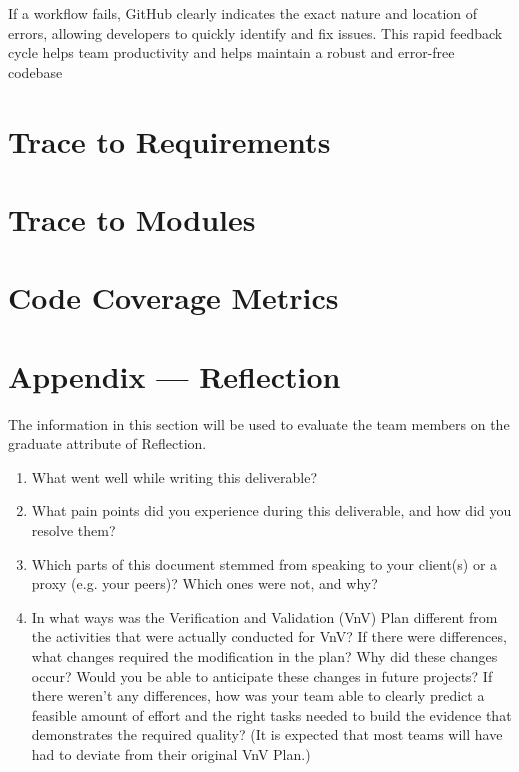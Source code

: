 \documentclass[12pt, titlepage]{article}
\begin{document}
If a workflow fails, GitHub clearly indicates the exact nature and location of errors, allowing developers to quickly identify and fix issues. This rapid feedback cycle helps team productivity and helps maintain a robust and error-free codebase



		
\section{Trace to Requirements}
		
\section{Trace to Modules}		

\section{Code Coverage Metrics}




\newpage{}
\section*{Appendix --- Reflection}

The information in this section will be used to evaluate the team members on the
graduate attribute of Reflection.



\begin{enumerate}
  \item What went well while writing this deliverable? 
  \item What pain points did you experience during this deliverable, and how
    did you resolve them?
  \item Which parts of this document stemmed from speaking to your client(s) or
  a proxy (e.g. your peers)? Which ones were not, and why?
  \item In what ways was the Verification and Validation (VnV) Plan different
  from the activities that were actually conducted for VnV?  If there were
  differences, what changes required the modification in the plan?  Why did
  these changes occur?  Would you be able to anticipate these changes in future
  projects?  If there weren't any differences, how was your team able to clearly
  predict a feasible amount of effort and the right tasks needed to build the
  evidence that demonstrates the required quality?  (It is expected that most
  teams will have had to deviate from their original VnV Plan.)
\end{enumerate}
\end{document}

